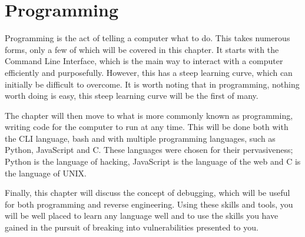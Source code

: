 \chapter{Programming}
	\label{ch:Programming}
	Programming is the act of telling a computer what to do. 
	This takes numerous forms, only a few of which will be covered in this chapter. 
	It starts with the Command Line Interface, which is the main way to interact with a computer efficiently and purposefully. 
	However, this has a steep learning curve, which can initially be difficult to overcome. 
	It is worth noting that in programming, nothing worth doing is easy, this steep learning curve will be the first of many. 

	The chapter will then move to what is more commonly known as programming, writing code for the computer to run at any time. 
	This will be done both with the CLI language, bash and with multiple programming languages, such as Python, JavaScript and C.
	These languages were chosen for their pervasiveness; Python is the language of hacking, JavaScript is the language of the web and C is the language of UNIX. 

	Finally, this chapter will discuss the concept of debugging, which will be useful for both programming and reverse engineering.
	Using these skills and tools, you will be well placed to learn any language well and to use the skills you have gained in the pursuit of breaking into vulnerabilities presented to you. 

